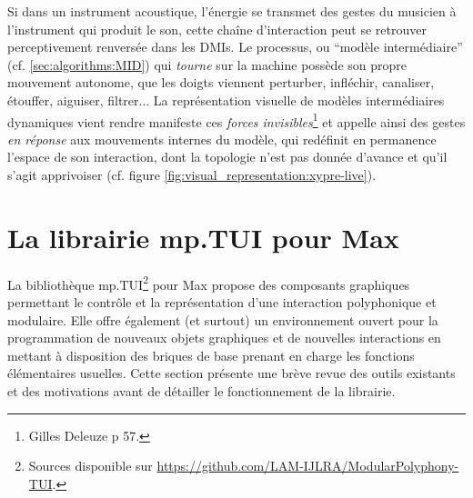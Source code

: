 \noindent Si dans un instrument acoustique, l'énergie se transmet des gestes du musicien à l'instrument qui produit le son, cette chaîne d'interaction peut se retrouver perceptivement renversée dans les \glspl{DMI}. Le processus, ou ``modèle intermédiaire'' (cf. \ref{sec:algorithms:MID}) qui \textit{tourne} sur la machine possède son propre mouvement autonome, que les doigts viennent perturber, infléchir, canaliser, étouffer, aiguiser, filtrer... La représentation visuelle de modèles intermédiaires dynamiques vient rendre manifeste ces \textit{forces invisibles}\footnote{ Gilles Deleuze \cite{deleuze_francis_1981} p 57.} et appelle ainsi des gestes \textit{en réponse} aux mouvements internes du modèle, qui redéfinit en permanence l'espace de son interaction, dont la topologie n'est pas donnée d'avance et qu'il s'agit apprivoiser (cf. figure \ref{fig:visual_representation:xypre-live}).




\section{La librairie mp.TUI pour Max}


\noindent La bibliothèque mp.TUI\footnote{Sources disponible sur \url{https://github.com/LAM-IJLRA/ModularPolyphony-TUI}.} pour Max propose des composants graphiques permettant le contrôle et la représentation d'une interaction polyphonique et modulaire. Elle offre également (et surtout) un environnement ouvert pour la programmation de nouveaux objets graphiques et de nouvelles interactions en mettant à disposition des briques de base prenant en charge les fonctions élémentaires usuelles. Cette section présente une brève revue des outils existants et des motivations avant de détailler le fonctionnement de la librairie.

